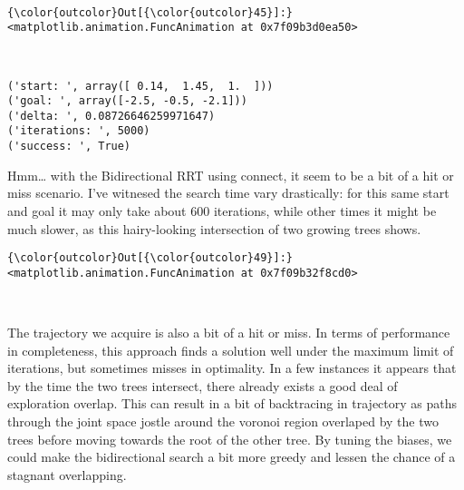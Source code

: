 \documentclass{article}
\begin{document}
    \begin{center}
    \end{center}
    { \hspace*{\fill} \\}
    

            \begin{Verbatim}[commandchars=\\\{\}]
{\color{outcolor}Out[{\color{outcolor}45}]:} <matplotlib.animation.FuncAnimation at 0x7f09b3d0ea50>
\end{Verbatim}
        
    \begin{center}
    \end{center}
    { \hspace*{\fill} \\}
    

    \begin{Verbatim}[commandchars=\\\{\}]
('start: ', array([ 0.14,  1.45,  1.  ]))
('goal: ', array([-2.5, -0.5, -2.1]))
('delta: ', 0.08726646259971647)
('iterations: ', 5000)
('success: ', True)
    \end{Verbatim}

    Hmm\ldots{} with the Bidirectional RRT using connect, it seem to be a
bit of a hit or miss scenario. I've witnesed the search time vary
drastically: for this same start and goal it may only take about 600
iterations, while other times it might be much slower, as this
hairy-looking intersection of two growing trees shows.




            \begin{Verbatim}[commandchars=\\\{\}]
{\color{outcolor}Out[{\color{outcolor}49}]:} <matplotlib.animation.FuncAnimation at 0x7f09b32f8cd0>
\end{Verbatim}
        
    \begin{center}
    \end{center}
    { \hspace*{\fill} \\}
    
    The trajectory we acquire is also a bit of a hit or miss. In terms of
performance in completeness, this approach finds a solution well under
the maximum limit of iterations, but sometimes misses in optimality. In
a few instances it appears that by the time the two trees intersect,
there already exists a good deal of exploration overlap. This can result
in a bit of backtracing in trajectory as paths through the joint space
jostle around the voronoi region overlaped by the two trees before
moving towards the root of the other tree. By tuning the biases, we
could make the bidirectional search a bit more greedy and lessen the
chance of a stagnant overlapping.
\end{document}
